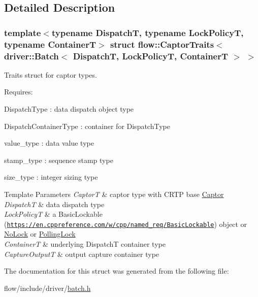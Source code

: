 \subsection{Detailed Description}
\subsubsection*{template$<$typename DispatchT, typename Lock\+PolicyT, typename ContainerT$>$\newline
struct flow\+::\+Captor\+Traits$<$ driver\+::\+Batch$<$ Dispatch\+T, Lock\+Policy\+T, Container\+T $>$ $>$}

Traits struct for captor types. 

Requires\+:
\begin{DoxyItemize}
\item {\ttfamily Dispatch\+Type} \+: data dispatch object type
\item {\ttfamily Dispatch\+Container\+Type} \+: container for {\ttfamily Dispatch\+Type}
\item {\ttfamily value\+\_\+type} \+: data value type
\item {\ttfamily stamp\+\_\+type} \+: sequence stamp type
\item {\ttfamily size\+\_\+type} \+: integer sizing type
\end{DoxyItemize}


\begin{DoxyTemplParams}{Template Parameters}
{\em CaptorT} & captor type with C\+R\+TP base {\ttfamily \hyperlink{classflow_1_1_captor}{Captor}}\\
\hline
{\em DispatchT} & data dispatch type \\
\hline
{\em Lock\+PolicyT} & a Basic\+Lockable (\href{https://en.cppreference.com/w/cpp/named_req/BasicLockable}{\tt https\+://en.\+cppreference.\+com/w/cpp/named\+\_\+req/\+Basic\+Lockable}) object or \hyperlink{structflow_1_1_no_lock}{No\+Lock} or \hyperlink{structflow_1_1_polling_lock}{Polling\+Lock} \\
\hline
{\em ContainerT} & underlying {\ttfamily DispatchT} container type \\
\hline
{\em Capture\+OutputT} & output capture container type \\
\hline
\end{DoxyTemplParams}


The documentation for this struct was generated from the following file\+:\begin{DoxyCompactItemize}
\item 
flow/include/driver/\hyperlink{batch_8h}{batch.\+h}\end{DoxyCompactItemize}

